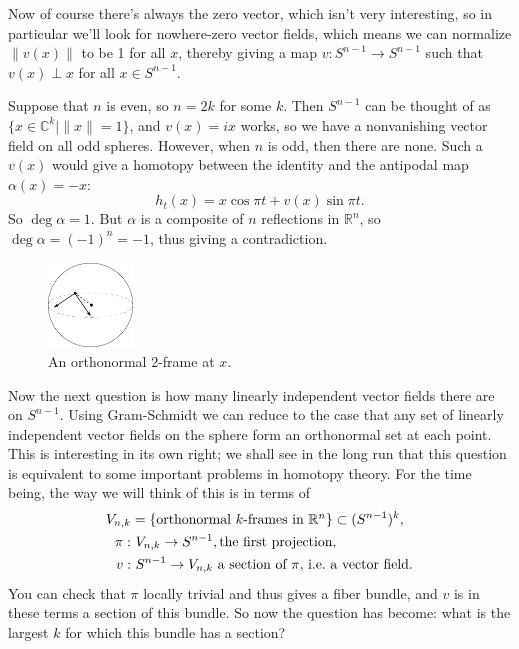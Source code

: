 \documentclass{article}
\newcommand{\C}{\mathbb{C}}
\newcommand{\R}{\mathbb{R}}
\begin{document}
Now of course there's always the zero vector, which isn't very interesting, so in particular we'll look for nowhere-zero vector fields, which means we can normalize $\|v(x)\|$ to be 1 for all $x$, thereby giving a map $v: S^{n-1} \to S^{n-1}$ such that $v(x) \perp x$ for all $x \in S^{n-1}$. %

Suppose that $n$ is even, so $n = 2k$ for some $k$.  Then $S^{n-1}$ can be thought of as $\{x \in \C^k \mid \|x\| = 1\}$, and $v(x) = ix$ works, so we have a nonvanishing vector field on all odd spheres.  However, when $n$ is odd, then there are none.  Such a $v(x)$ would give a homotopy between the identity and the antipodal map $\alpha(x) = -x$: \[h_t(x) = x \cos \pi t + v(x) \sin \pi t.\]  So $\deg \alpha = 1$.  But $\alpha$ is a composite of $n$ reflections in $\R^n$, so $\deg \alpha = (-1)^n = -1$, thus giving a contradiction.

\begin{figure}
\centering\includegraphics[width=0.2\textwidth]{figures/fig2.pdf}
\caption{\small An orthonormal $2$-frame at $x$.}
\end{figure}
Now the next question is how many linearly independent vector fields there are on $S^{n-1}$.  Using Gram-Schmidt we can reduce to the case that any set of linearly independent vector fields on the sphere form an orthonormal set at each point.  This is interesting in its own right; we shall see in the long run that this question is equivalent to some important problems in homotopy theory.  For the time being, the way we will think of this is in terms of
\begin{align*}
V_{n, k} & = \{\hbox{orthonormal $k$-frames in $\R^n$}\} \subset (S^{n-1})^k, \\
\pi: &\,\, V_{n, k} \to S^{n-1}, \hbox{the first projection}, \\
v: &\,\, S^{n-1} \to V_{n, k}\hbox{ a section of $\pi$, i.e.\ a vector field}.
\end{align*}
You can check that $\pi$ locally trivial and thus gives a fiber bundle, and $v$ is in these terms a section of this bundle.  So now the question has become: what is the largest $k$ for which this bundle has a section?
\end{document}
